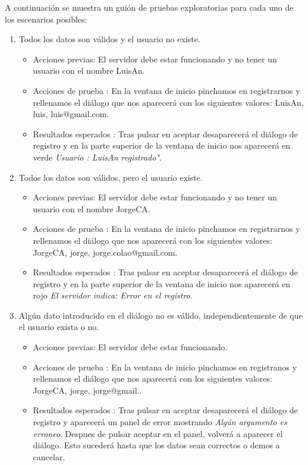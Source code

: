 A continuación se muestra un guión de pruebas exploratorias para cada uno de los escenarios posibles:
\begin{enumerate}
\item Todos los datos son válidos y el usuario no existe.
	\begin{itemize}
	\item Acciones previas: El servidor debe estar funcionando y no tener un usuario con el nombre LuisAn.
	\item Acciones de prueba : En la ventana de inicio pinchamos en registrarnos y rellenamos el diálogo que nos aparecerá con los siguientes valores: LuisAn, luis, luis@gmail.com.
	\item Resultados esperados : Tras pulsar en aceptar  desaparecerá el diálogo de registro y en la parte superior de la ventana de inicio nos aparecerá en verde \emph {Usuario : LuisAn registrado"}.
	\end{itemize}
\item Todos los datos son válidos, pero el usuario existe.
	\begin{itemize}
	\item Acciones previas: El servidor debe estar funcionando y no tener un usuario con el nombre JorgeCA.
	\item Acciones de prueba : En la ventana de inicio pinchamos en registrarnos y rellenamos el diálogo que nos aparecerá con los siguientes valores: JorgeCA, jorge, jorge.colao@gmail.com.
	\item Resultados esperados : Tras pulsar en aceptar desaparecerá el diálogo de registro y en la parte superior de la ventana de inicio nos aparecerá en rojo \emph {El servidor indica: Error en el registro}.
	\end{itemize}

\item Algún dato introducido en el diálogo no es válido, independientemente de que el usuario exista o no.
	\begin{itemize}
	\item Acciones previas: El servidor debe estar funcionando.
	\item Acciones de prueba : En la ventana de inicio pinchamos en registranos y rellenamos el diálogo que nos aparecerá con los siguientes valores: JorgeCA, jorge, jorge@gmail..
	\item Resultados esperados : Tras pulsar en aceptar desaparecerá el diálogo de registro y aparecerá un panel de error mostrando \emph{Algún argumento es erroneo}. Despues de pulsar aceptar en el panel, volverá a aparecer el diálogo. Esto sucederá hasta que los datos sean correctos o demos a cancelar.
	\end{itemize}
\end{enumerate}
